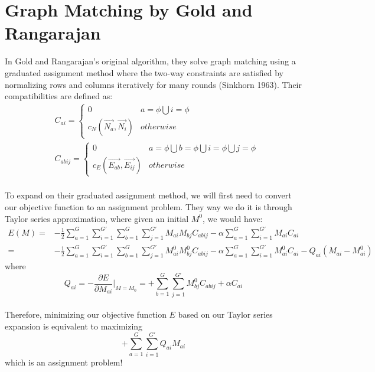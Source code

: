 \section{Graph Matching by Gold and Rangarajan}

In Gold and Rangarajan's original algorithm, they solve graph matching using a graduated assignment method where the two-way constraints are satisfied by normalizing rows and columns iteratively for many rounds (Sinkhorn 1963). Their compatibilities are defined as:
\begin{align} 
& C_{ai}  = \begin{cases}0 & a=\phi \bigcup i=\phi \\c_N(\overrightarrow{N_{a}},\overrightarrow{N_{i}}) & otherwise\end{cases}\\
& C_{abij} = \begin{cases}0 & a=\phi \bigcup b=\phi \bigcup i=\phi \bigcup j=\phi \\c_E(\overrightarrow{E_{ab}},\overrightarrow{E_{ij}}) & otherwise\end{cases} 
\end{align}\\

To expand on their graduated assignment method, we will first need to convert our objective function to an assignment problem. They way we do it is through Taylor series approximation, where given an initial $M^0$, we would have:
\begin{align}
E(M) = & -\frac{1}{2}\sum_{a=1}^{G}\sum_{i=1}^{G'}\sum_{b=1}^{G}\sum_{j=1}^{G'}M_{ai}M_{bj}C_{abij}-\alpha\sum_{a=1}^{G}\sum_{i=1}^{G'}M_{ai}C_{ai}\nonumber\\
= & -\frac{1}{2}\sum_{a=1}^{G}\sum_{i=1}^{G'}\sum_{b=1}^{G}\sum_{j=1}^{G'}M_{ai}^{0}M_{bj}^{0}C_{abij}-\alpha\sum_{a=1}^{G}\sum_{i=1}^{G'}M_{ai}^{0}C_{ai} - Q_{ai}(M_{ai}-M_{ai}^{0})
\end{align}
where
\begin{equation} 
Q_{ai}=-\frac{\partial E}{\partial M_{ai}}\bigg\rvert_{M=M_0}=+\sum_{b=1}^{G}\sum_{j=1}^{G'}M_{bj}^{0}C_{abij}+\alpha C_{ai}
\end{equation}\\

Therefore, minimizing our objective function $E$ based on our Taylor series expansion is equivalent to maximizing 
\begin{equation}
+\sum_{a=1}^{G}\sum_{i=1}^{G'}Q_{ai}M_{ai}
\end{equation}
which is an assignment problem!\\


